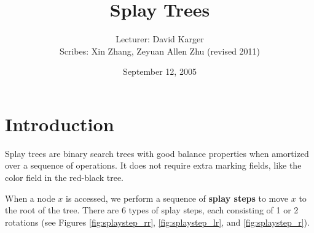 \documentclass{article}
\title{Splay Trees}
\date{September 12, 2005}
\author{Lecturer: David Karger\\ Scribes: Xin Zhang, Zeyuan Allen Zhu (revised 2011)}
\begin{document}

%
%
%
%

%



\section{Introduction}

Splay trees are binary search trees with good balance properties when
amortized over a sequence of operations. It does not require extra marking fields, like the color field in the red-black tree.

When a node $x$ is accessed, we perform a sequence of \textbf{splay steps}
to move $x$ to the root of the tree. There are 6 types of splay steps,
each consisting of 1 or 2 rotations (see Figures \ref{fig:splaystep_rr},
\ref{fig:splaystep_lr}, and \ref{fig:splaystep_r}).
\end{document}
